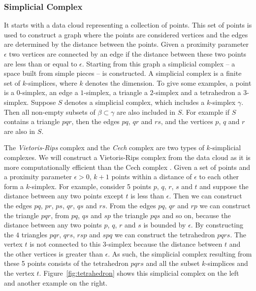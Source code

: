 \documentclass[letter,12pt]{article}
\begin{document}
\subsubsection{Simplicial Complex}\label{subsubsec:simplicialcomplex}
It starts with a data cloud  representing a collection of points. This set of points is used to construct a graph where the points are considered vertices and the edges are determined by the distance between the points. Given a proximity parameter $\epsilon$ two vertices are connected by an edge if the distance between these two points are less than or equal to $\epsilon$. Starting from this graph a simplicial complex -- a space built from simple pieces -- is constructed. A simplicial complex is a finite set of $k$-simplices, where $k$ denotes the dimension. To give some examples, a point is a $0$-simplex, an edge a $1$-simplex, a triangle a $2$-simplex and a tetrahedron a $3$-simplex. Suppose $S$ denotes a simplicial complex, which includes a $k$-simplex $\gamma$. Then all non-empty subsets of $\beta \subset \gamma$ are also included in $S$. For example if $S$ contains a triangle $pqr$, then the edges $pq$, $qr$ and $rs$, and the vertices $p$, $q$ and $r$ are also in $S$. 

The \textit{Vietoris-Rips} complex and the \textit{Cech} complex are two types of $k$-simplicial complexes. We will construct a Vietoris-Rips complex from the data cloud as it is more computationally efficient than the Cech complex \citep{ghrist2008barcodes}. Given a set of points and a proximity parameter $\epsilon > 0$, $k+1$ points within a distance of $\epsilon$ to each other form a $k$-simplex.  For example, consider 5 points $p$, $q$, $r$, $s$ and $t$ and suppose the distance between any two points except $t$ is less than $\epsilon$. Then we can construct the edges $pq$, $pr$, $ps$, $qr$, $qs$ and $rs$. From the edges $pq$, $qr$ and $rp$ we can construct the triangle $pqr$, from $pq$, $qs$ and $sp$ the triangle $pqs$ and so on, because the distance between any two points $p$, $q$, $r$ and $s$ is bounded by $\epsilon$. By constructing the $4$ triangles $pqr$, $qrs$, $rsp$ and $spq$ we can construct the tetrahedron $pqrs$. The vertex $t$ is not connected to this $3$-simplex because the distance between $t$ and the other vertices is greater than $\epsilon$. As such, the simplicial complex resulting from these 5 points consists of the tetrahedron $pqrs$ and all the subset $k$-simplices and the vertex $t$. Figure~\ref{fig:tetrahedron} shows this simplicial complex on the left and another example on the right. 
\end{document}
